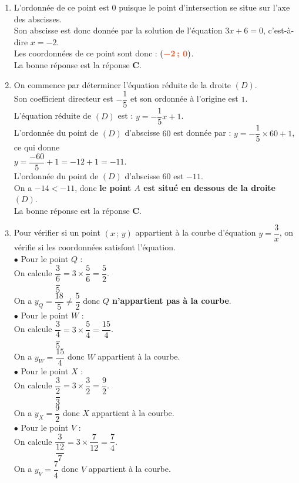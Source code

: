 \documentclass[a4paper,11pt]{article}
\newcounter{seancenum}
\begin{document}
\setcounter{seancenum}{29}
\newpage
\begin{seance}{} %

\begin{enumerate}
\item L'ordonnée de ce point est $0$ puisque le point d'intersection se situe sur l'axe des abscisses.\\
      Son abscisse est donc donnée par la solution de l'équation  $3x+6=0$, c'est-à-dire $x=-2$.
    \\Les coordonnées de ce   point sont donc : $({\color[HTML]{F15929}\boldsymbol{-2\,;\,0}})$.\\La bonne réponse est la réponse {\bfseries \color[HTML]{F15929}C}.

\item On commence par déterminer l'équation réduite de la droite $(D)$.\\
    Son coefficient directeur est $-\dfrac{1}{5}$ et son ordonnée à l'origine est $1$.\\
    L'équation réduite de $(D)$ est : $y=-\dfrac{1}{5}x+1$.\\
    L'ordonnée du point de $(D)$ d'abscisse $60$ est donnée par : $y=-\dfrac{1}{5}\times 60+1$, ce qui donne\\
    $y=\dfrac{-60}{5}+1=-12+1=-11$.\\
    L'ordonnée du point de $(D)$ d'abscisse $60$ est $-11$.\\On a $-14<-11$, donc {\bfseries \color[HTML]{F15929}le point $A$ est situé en dessous de la droite $(D)$}.\\La bonne réponse est la réponse {\bfseries \color[HTML]{F15929}C}.

\item Pour vérifier si un point $(x\,;\,y)$ appartient à la courbe d'équation $y=\dfrac{3}{x}$, on vérifie si les coordonnées satisfont l'équation.\\$\bullet$ Pour le point $Q$ :\\On calcule $\dfrac{3}{\dfrac{6}{5}}=3\times \dfrac{5}{6}=\dfrac{5}{2}$.\\On a $y_{Q}=\dfrac{18}{5}\neq \dfrac{5}{2}$ donc {\bfseries \color[HTML]{F15929}$Q$ n'appartient pas à la courbe}.\\$\bullet$ Pour le point $W$ :\\On calcule $\dfrac{3}{\dfrac{4}{5}}=3\times \dfrac{5}{4}=\dfrac{15}{4}$.\\On a $y_{W}=\dfrac{15}{4}$ donc $W$ appartient à la courbe.\\$\bullet$ Pour le point $X$ :\\On calcule $\dfrac{3}{\dfrac{2}{3}}=3\times \dfrac{3}{2}=\dfrac{9}{2}$.\\On a $y_{X}=\dfrac{9}{2}$ donc $X$ appartient à la courbe.\\$\bullet$ Pour le point $V$ :\\On calcule $\dfrac{3}{\dfrac{12}{7}}=3\times \dfrac{7}{12}=\dfrac{7}{4}$.\\On a $y_{V}=\dfrac{7}{4}$ donc $V$ appartient à la courbe.


\end{enumerate}
\end{seance}
\end{document}
